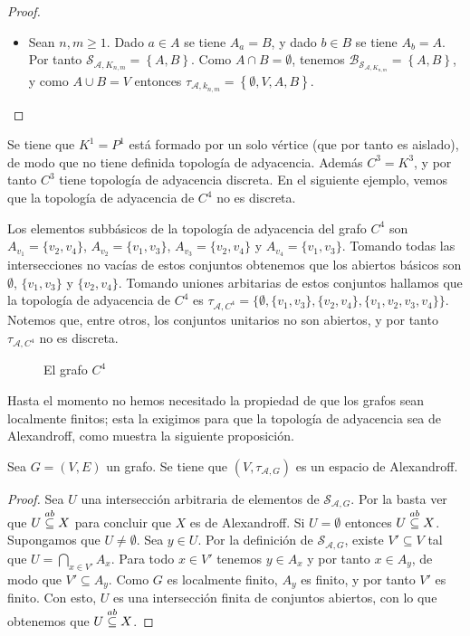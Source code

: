 \begin{proof}
\begin{itemize}
      \item[4.] Sean $n,m\ge 1$. Dado $a\in A$ se tiene $A_a=B$, y dado $b\in B$ se tiene $A_b=A$. Por tanto $\mathcal{S}_{\mathcal{A},K_{n,m}}=\left\lbrace A,B\right\rbrace$. Como $A\cap B=\emptyset$, tenemos $\mathcal{B}_{\mathcal{S}_{\mathcal{A},K_{n,m}}}=\left\lbrace A,B\right\rbrace$, y como $A\cup B=V$ entonces $\tau_{\mathcal{A},k_{n,m}}=\left\lbrace \emptyset,V,A,B\right\rbrace$. 
   \end{itemize}
\end{proof}
\begin{Obs}
   Se tiene que $K^1=P^1$ está formado por un solo vértice (que por tanto es aislado), de modo que no tiene definida topología de adyacencia. Además $C^3=K^3$, y por tanto $C^3$ tiene topología de adyacencia discreta. En el siguiente ejemplo, vemos que la topología de adyacencia de $C^4$ no es discreta. 
\end{Obs}
\begin{Ejm}
   Los elementos subbásicos de la topología de adyacencia del grafo $C^4$ son $A_{v_1} = \{v_2, v_4\}$, $A_{v_2} = \{v_1, v_3\}$, $A_{v_3} = \{v_2, v_4\}$ y $A_{v_4} = \{v_1, v_3\}$. Tomando todas las intersecciones no vacías de estos conjuntos obtenemos que los abiertos básicos son $\emptyset$, $\{v_1, v_3\}$ y $\{v_2, v_4\}$. Tomando uniones arbitarias de estos conjuntos hallamos que la topología de adyacencia de $C^4$ es $\tau_{\mathcal{A},C^4}=\{\emptyset, \{v_1,v_3\},\{v_2,v_4\},\{v_1,v_2,v_3,v_4\}\}$. Notemos que, entre otros, los conjuntos unitarios no son abiertos, y por tanto $\tau_{\mathcal{A},C^4}$ no es discreta.
   \begin{figure}[H]
     \renewcommand{\diagscale}{0.2\textwidth}%
      \centering
      \resizebox{\diagscale}{!}{}
    \caption{El grafo $C^4$}
   \end{figure}
\end{Ejm}
Hasta el momento no hemos necesitado la propiedad de que los grafos sean localmente finitos; esta la exigimos para que la topología de adyacencia sea de Alexandroff, como muestra la siguiente proposición.
\begin{Prop}\label{Prop:Adyacencia_Alexandroff}
   Sea $G=(V,E)$ un grafo. Se tiene que $(V,\tau_{\mathcal{A},G})$ es un espacio de Alexandroff.
\end{Prop}
\begin{proof}
   Sea $U$ una intersección arbitraria de elementos de $\mathcal{S}_{\mathcal{A},G}$. Por la  basta ver que $U\stackrel{ab}{\subseteq} X$ para concluir que $X$ es de Alexandroff. Si $U=\emptyset$ entonces $U\stackrel{ab}{\subseteq} X$. Supongamos que $U\ne \emptyset$. Sea $y\in U$. Por la definición de $\mathcal{S}_{\mathcal{A},G}$, existe $V'\subseteq V$ tal que $U=\bigcap_{x\in V'}A_x$. Para todo $x\in V'$ tenemos $y\in A_x$ y por tanto $x\in A_y$, de modo que $V'\subseteq A_y$. Como $G$ es localmente finito, $A_y$ es finito, y por tanto $V'$ es finito. Con esto, $U$ es una intersección finita de conjuntos abiertos, con lo que obtenemos que $U\stackrel{ab}{\subseteq} X$.
\end{proof}
